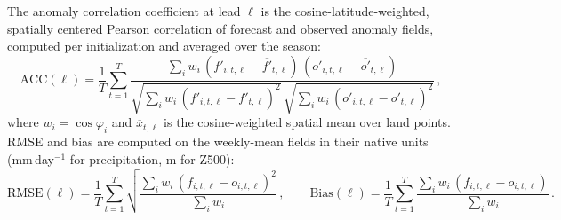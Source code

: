 \documentclass[11pt,a4paper]{article}
\begin{document}
The anomaly correlation coefficient \citep[ACC; cf.][]{murphy1988} at lead
$\ell$ is the cosine-latitude-weighted, spatially centered Pearson correlation
of forecast and observed anomaly fields, computed per initialization and
averaged over the season:
\begin{equation}
  \mathrm{ACC}(\ell) = \frac{1}{T}\sum_{t=1}^{T}
  \frac{\sum_i w_i\,(f'_{i,t,\ell}-\overline{f'}_{t,\ell})\,
                     (o'_{i,t,\ell}-\overline{o'}_{t,\ell})}
       {\sqrt{\sum_i w_i\,(f'_{i,t,\ell}-\overline{f'}_{t,\ell})^{2}}\,
        \sqrt{\sum_i w_i\,(o'_{i,t,\ell}-\overline{o'}_{t,\ell})^{2}}}\,,
  \label{eq:acc}
\end{equation}
where $w_i=\cos\varphi_i$ and $\overline{x}_{t,\ell}$ is the cosine-weighted
spatial mean over land points. RMSE and bias are computed on the weekly-mean
fields in their native units (mm\,day$^{-1}$ for precipitation, m for Z500):
\begin{equation}
  \mathrm{RMSE}(\ell) = \frac{1}{T}\sum_{t=1}^{T}
  \sqrt{\frac{\sum_i w_i\,(f_{i,t,\ell}-o_{i,t,\ell})^{2}}{\sum_i w_i}}\,,
  \qquad
  \mathrm{Bias}(\ell) = \frac{1}{T}\sum_{t=1}^{T}
  \frac{\sum_i w_i\,(f_{i,t,\ell}-o_{i,t,\ell})}{\sum_i w_i}\,.
  \label{eq:rmse_bias}
\end{equation}
\end{document}

